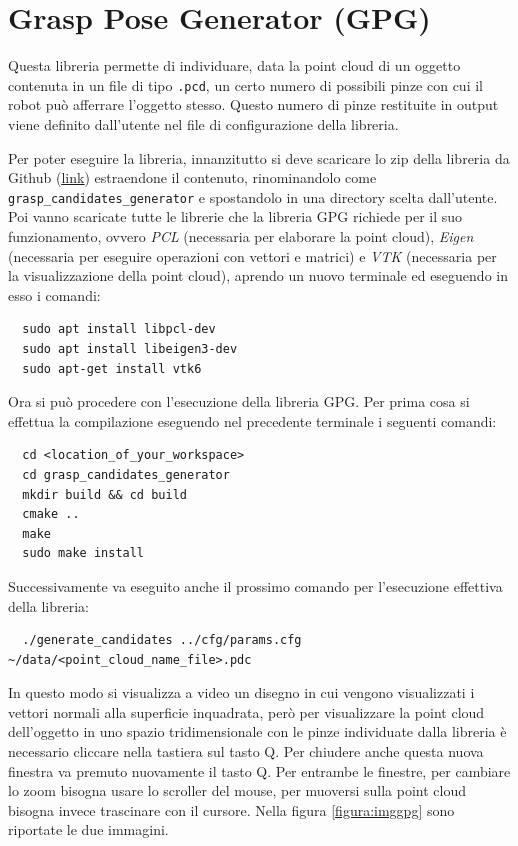 \documentclass{report}
\begin{document}
\section{Grasp Pose Generator (GPG)}\label{GPG}
Questa libreria permette di individuare, data la point cloud di un oggetto contenuta in un file di tipo \texttt{.pcd}, un certo numero di possibili pinze con cui il robot può afferrare l'oggetto stesso. Questo numero di pinze restituite in output viene definito dall'utente nel file di configurazione della libreria. \par
Per poter eseguire la libreria, innanzitutto si deve scaricare lo zip della libreria da Github (\textcolor{blue}{\underline{\href{https://github.com/atenpas/gpg}{link}}}) estraendone il contenuto, rinominandolo come \texttt{grasp\_candidates\_generator} e spostandolo in una directory scelta dall'utente. Poi vanno scaricate tutte le librerie che la libreria GPG richiede per il suo funzionamento, ovvero \textit{PCL} (necessaria per elaborare la point cloud), \textit{Eigen} (necessaria per eseguire operazioni con vettori e matrici) e \textit{VTK} (necessaria per la visualizzazione della point cloud), aprendo un nuovo terminale ed eseguendo in esso i comandi:
\begin{verbatim}
  sudo apt install libpcl-dev
  sudo apt install libeigen3-dev
  sudo apt-get install vtk6
\end{verbatim}
Ora si può procedere con l'esecuzione della libreria GPG. Per prima cosa si effettua la compilazione eseguendo nel precedente terminale i seguenti comandi:
\begin{verbatim}
  cd <location_of_your_workspace>  
  cd grasp_candidates_generator
  mkdir build && cd build
  cmake ..
  make
  sudo make install
\end{verbatim}
Successivamente va eseguito anche il prossimo comando per l'esecuzione effettiva della libreria:
\begin{verbatim}
  ./generate_candidates ../cfg/params.cfg ~/data/<point_cloud_name_file>.pdc
\end{verbatim}
In questo modo si visualizza a video un disegno in cui vengono visualizzati i vettori normali alla superficie inquadrata, però per visualizzare la point cloud dell'oggetto in uno spazio tridimensionale con le pinze individuate dalla libreria è necessario cliccare nella tastiera sul tasto Q. Per chiudere anche questa nuova finestra va premuto nuovamente il tasto Q. Per entrambe le finestre, per cambiare lo zoom bisogna usare lo scroller del mouse, per muoversi sulla point cloud bisogna invece trascinare con il cursore. Nella figura \ref{figura:imggpg} sono riportate le due immagini. 
\end{document}
